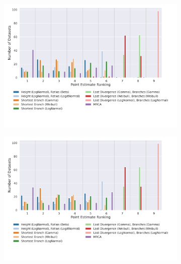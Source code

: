 \documentclass[10pt,letterpaper]{article}
\begin{document}
\begin{figure}
	\caption{How often each method ranked at a certain position when its point estimate is compared to the other methods. For example, MRCA ranked first for the majority of datasets. (The lower the rank the better.)}
	
	\centering
	\begin{subfigure}[b]{0.4\textwidth}
		\centering
		\includegraphics[width=\textwidth]{figures/yule-100-ccd1-point-estimates-ranking.png}
	\end{subfigure}
	\begin{subfigure}[b]{0.4\textwidth}
		\centering
		\includegraphics[width=\textwidth]{figures/yule-200-ccd1-point-estimates-ranking.png}
	\end{subfigure}
	

\end{figure}
\end{document}

